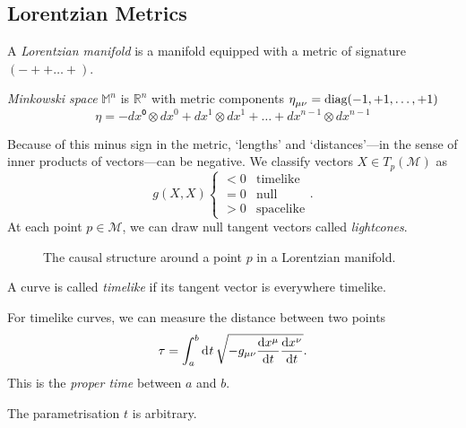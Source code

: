 \subsection*{Lorentzian Metrics}%

\begin{definition}
  A \emph{Lorentzian manifold} is a manifold equipped with a metric of signature $(- + + \dots +)$.
\end{definition}
\begin{definition}
  \emph{Minkowski space} $\mathbb{M}^n$ is $\mathbb{R}^n$ with metric components $\eta\indices{_\mu_\nu} = \text{diag}(-1, +1, \dots, +1)$
  \begin{equation}
    \eta = -dx⁰ \otimes dx^0 + dx^1 \otimes dx^1 + \dots + dx^{n-1} \otimes dx^{n-1}
  \end{equation}
\end{definition}
Because of this minus sign in the metric, `lengths' and `distances'---in the sense of inner products of vectors---can be negative.
We classify vectors $X \in T_p(\mathcal{M})$ as
\begin{equation}
  g(X, X) 
  \begin{cases}
    < 0 & \text{timelike} \\
    = 0 & \text{null} \\
    > 0 & \text{spacelike}
  \end{cases}.
\end{equation}
At each point $p \in \mathcal{M}$, we can draw null tangent vectors called \emph{lightcones}.
\begin{figure}[tbhp]
  \centering
  \def\svgwidth{0.2\columnwidth}
  
  \caption{The causal structure around a point $p$ in a Lorentzian manifold.}
  \label{fig:causal-structure-M4}
\end{figure}
\begin{definition}[]
  A curve is called \emph{timelike} if its tangent vector is everywhere timelike.
\end{definition}

\begin{definition}
  For timelike curves, we can measure the distance between two points
  \begin{equation}
    \tau = \int_{a}^{b} \dd[]{t} \sqrt{-g_{\mu\nu} \dv{x^\mu}{t} \dv{x^\nu}{t}}.
  \end{equation}
  This is the \emph{proper time} between $a$ and $b$.
\end{definition}
\begin{leftbar}
  \begin{remark}
    The parametrisation $t$ is arbitrary.
  \end{remark}
\end{leftbar}

